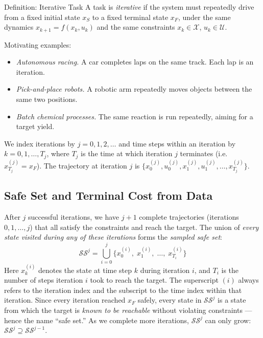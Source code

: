 \begin{defnbox}{Definition: Iterative Task}
	A task is \emph{iterative} if the system must repeatedly drive from a fixed initial state $x_S$ to a fixed terminal state $x_F$, under the same dynamics $x_{k+1} = f(x_k, u_k)$ and the same constraints $x_k \in \mathcal{X}$, $u_k \in \mathcal{U}$.
\end{defnbox}

Motivating examples:
\begin{itemize}[noitemsep]
	\item \emph{Autonomous racing.} A car completes laps on the same track. Each lap is an iteration.
	\item \emph{Pick-and-place robots.} A robotic arm repeatedly moves objects between the same two positions.
	\item \emph{Batch chemical processes.} The same reaction is run repeatedly, aiming for a target yield.
\end{itemize}

We index iterations by $j = 0, 1, 2, \ldots$ and time steps within an iteration by $k = 0, 1, \ldots, T_j$, where $T_j$ is the time at which iteration $j$ terminates (i.e.\ $x_{T_j}^{(j)} = x_F$). The trajectory at iteration $j$ is $\{x_0^{(j)}, u_0^{(j)}, x_1^{(j)}, u_1^{(j)}, \ldots, x_{T_j}^{(j)}\}$.


\subsection{Safe Set and Terminal Cost from Data}
\label{sec:lmpc_safe_set}

After $j$ successful iterations, we have $j+1$ complete trajectories (iterations $0, 1, \ldots, j$) that all satisfy the constraints and reach the target. The union of \emph{every state visited during any of these iterations} forms the \emph{sampled safe set}:
\begin{equation*}
	\mathcal{SS}^j = \bigcup_{i=0}^{j}\bigl\{x_0^{(i)},\; x_1^{(i)},\; \ldots,\; x_{T_i}^{(i)}\bigr\}
\end{equation*}
Here $x_k^{(i)}$ denotes the state at time step $k$ during iteration $i$, and $T_i$ is the number of steps iteration $i$ took to reach the target. The superscript $(i)$ always refers to the iteration index and the subscript to the time index within that iteration. Since every iteration reached $x_F$ safely, every state in $\mathcal{SS}^j$ is a state from which the target is \emph{known to be reachable} without violating constraints --- hence the name ``safe set.'' As we complete more iterations, $\mathcal{SS}^j$ can only grow: $\mathcal{SS}^{j} \supseteq \mathcal{SS}^{j-1}$.

